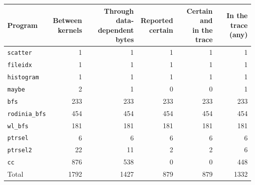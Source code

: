 \begin{tabular}{lrrrrr}
\toprule
Program & \shortstack{Between\\kernels} & \shortstack{Through data-\\dependent bytes} & \shortstack{Reported\\certain} & \shortstack{Certain and\\in the trace} & \shortstack{In the trace\\(any)} \\
\midrule
\texttt{scatter} & 1 & 1 & 1 & 1 & 1 \\
\texttt{fileidx} & 1 & 1 & 1 & 1 & 1 \\
\texttt{histogram} & 1 & 1 & 1 & 1 & 1 \\
\texttt{maybe} & 2 & 1 & 0 & 0 & 1 \\
\texttt{bfs} & 233 & 233 & 233 & 233 & 233 \\
\texttt{rodinia\_bfs} & 454 & 454 & 454 & 454 & 454 \\
\texttt{wl\_bfs} & 181 & 181 & 181 & 181 & 181 \\
\texttt{ptrsel} & 6 & 6 & 6 & 6 & 6 \\
\texttt{ptrsel2} & 22 & 11 & 2 & 2 & 6 \\
\texttt{cc} & 876 & 538 & 0 & 0 & 448 \\
\midrule
Total & 1792 & 1427 & 879 & 879 & 1332 \\
\bottomrule
\end{tabular}
